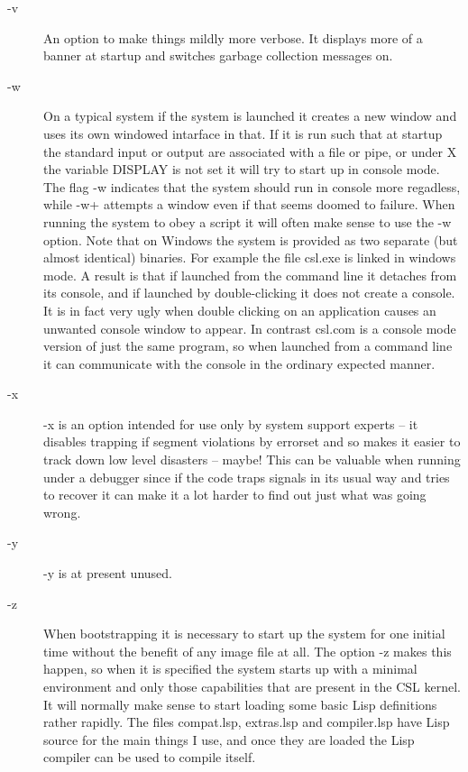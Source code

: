 \documentclass[a4paper,11pt]{article}
\begin{document}
\begin{description}
\item [{\ttfamily -v}] 
An option to make things mildly more verbose. It displays more of a banner
at startup and switches garbage collection messages on.

\item [{\ttfamily -w}] 
On a typical system if the system is launched it creates a new window and uses
its own windowed intarface in that. If it is run such that at startup the
standard input or output are associated with a file or pipe, or under X the
variable {\ttfamily DISPLAY} is not set it will try to start up in console
mode. The flag {\ttfamily -w} indicates that the system should run in console
more regadless, while {\ttfamily -w+} attempts a window even if that seems
doomed to failure. When running the system to obey a script it will often make
sense to use the {\ttfamily -w} option. Note that on Windows the system is
provided as two separate (but almost identical) binaries. For example the
file {\ttfamily csl.exe} is linked in windows mode. A result is that if
launched from the command line it detaches from its console, and if launched
by double-clicking it does not create a console. It is in fact very ugly when
double clicking on an application causes an unwanted console window to appear.
In contrast {\ttfamily csl.com} is a console mode version of just the same
program, so when launched from a command line it can communicate with the
console in the ordinary expected manner.

\item [{\ttfamily -x}] 
{\ttfamily -x} is an option intended for use only by system
support experts -- it disables trapping if segment violations by
errorset and so makes it easier to track down low level disasters --
maybe!  This can be valuable when running under a debugger since if the
code traps signals in its usual way and tries to recover it can make it a lot
harder to find out just what was going wrong.

\item [{\ttfamily -y}] 
{\ttfamily -y } is at present unused.

\item [{\ttfamily -z}] 
When bootstrapping it is necessary to start up the system for one initial time
without the benefit of any image file at all. The option {\ttfamily -z} makes
this happen, so when it is specified the system starts up with a minimal
environment and only those capabilities that are present in the CSL
kernel. It will normally make sense to start loading some basic Lisp
definitions rather rapidly. The files {\ttfamily compat.lsp},
{\ttfamily extras.lsp} and {\ttfamily compiler.lsp} have Lisp source for the
main things I use, and once they are loaded the Lisp compiler can be used
to compile itself.

\end{description} %
\end{document}
